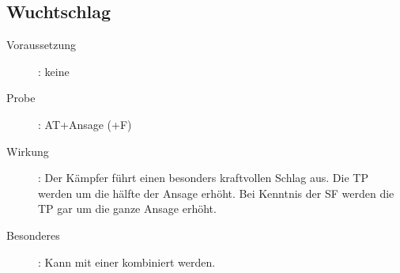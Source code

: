 \subsection{Wuchtschlag}
\label{aktion.wuchtschlag}
\begin{description}
    \item[Voraussetzung]:
        keine
    \item[Probe]:
        AT+Ansage (+F)
    \item[Wirkung]:
        Der Kämpfer führt einen besonders kraftvollen Schlag aus.
        Die TP werden um die hälfte der Ansage erhöht.
        Bei Kenntnis der SF  werden die TP gar um die ganze Ansage erhöht.
    \item[Besonderes]:
        Kann mit einer  kombiniert werden.
\end{description}
